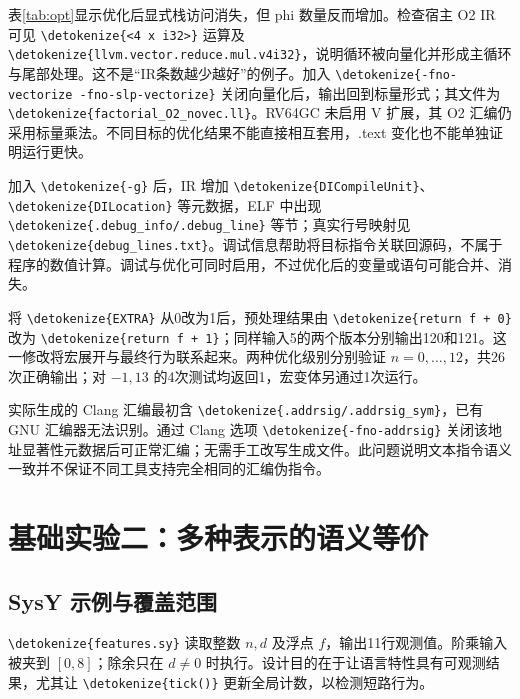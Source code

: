 \documentclass[UTF8,a4paper,10pt,fontset=none]{ctexart}
\newcommand{\code}[1]{{\small\expandafter\nolinkurl\expandafter{\detokenize{#1}}}}
\begin{document}
表\ref{tab:opt}显示优化后显式栈访问消失，但 phi 数量反而增加。检查宿主 O2 IR 可见 \code{<4 x i32>} 运算及 \code{llvm.vector.reduce.mul.v4i32}，说明循环被向量化并形成主循环与尾部处理。这不是“IR条数越少越好”的例子。加入 \code{-fno-vectorize -fno-slp-vectorize} 关闭向量化后，输出回到标量形式；其文件为 \code{factorial_O2_novec.ll}。RV64GC 未启用 V 扩展，其 O2 汇编仍采用标量乘法。不同目标的优化结果不能直接相互套用，.text 变化也不能单独证明运行更快。

加入 \code{-g} 后，IR 增加 \code{DICompileUnit}、\code{DILocation} 等元数据，ELF 中出现 \code{.debug_info/.debug_line} 等节；真实行号映射见 \code{debug_lines.txt}。调试信息帮助将目标指令关联回源码，不属于程序的数值计算。调试与优化可同时启用，不过优化后的变量或语句可能合并、消失。

将 \code{EXTRA} 从0改为1后，预处理结果由 \code{return f + 0} 改为 \code{return f + 1}；同样输入5的两个版本分别输出120和121。这一修改将宏展开与最终行为联系起来。两种优化级别分别验证 $n=0,\ldots,12$，共26次正确输出；对 $-1,13$ 的4次测试均返回1，宏变体另通过1次运行。

实际生成的 Clang 汇编最初含 \code{.addrsig/.addrsig_sym}，已有 GNU 汇编器无法识别。通过 Clang 选项 \code{-fno-addrsig} 关闭该地址显著性元数据后可正常汇编；无需手工改写生成文件。此问题说明文本指令语义一致并不保证不同工具支持完全相同的汇编伪指令。

\section{基础实验二：多种表示的语义等价}
\subsection{SysY 示例与覆盖范围}
\code{features.sy} 读取整数 $n,d$ 及浮点 $f$，输出11行观测值。阶乘输入被夹到 $[0,8]$；除余只在 $d\ne0$ 时执行。设计目的在于让语言特性具有可观测结果，尤其让 \code{tick()} 更新全局计数，以检测短路行为。
\end{document}
